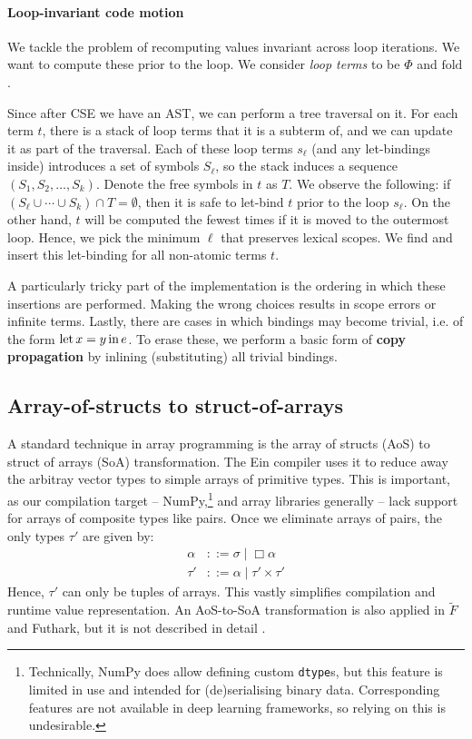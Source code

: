 \paragraph{Loop-invariant code motion} We tackle the problem of recomputing values invariant across loop iterations. We want to compute these prior to the loop. We consider \textit{loop terms} to be $\Phi$ and $\mathrm{fold}$. 

Since after CSE we have an AST, we can perform a tree traversal on it. For each term $t$, there is a stack of loop terms that it is a subterm of, and we can update it as part of the traversal. Each of these loop terms $s_\ell$ (and any let-bindings inside) introduces a set of symbols $S_\ell$, so the stack induces a sequence $(S_1, S_2, \dots, S_k)$. Denote the free symbols in $t$ as $T$. We observe the following: if $\left( S_\ell \cup \cdots \cup S_k \right) \cap T = \emptyset$, then it is safe to let-bind $t$ prior to the loop $s_\ell$. On the other hand, $t$ will be computed the fewest times if it is moved to the outermost loop. Hence, we pick the minimum $\ell$ that preserves lexical scopes. We find and insert this let-binding for all non-atomic terms $t$.

A particularly tricky part of the implementation is the ordering in which these insertions are performed. Making the wrong choices results in scope errors or infinite terms. 
Lastly, there are cases in which bindings may become trivial, i.e. of the form $\mathrm{let}\,{x}={y}\,\mathrm{in}\,{e}$. To erase these, we perform a basic form of \textbf{copy propagation} by inlining (substituting) all trivial bindings.

\subsection{Array-of-structs to struct-of-arrays}

A standard technique in array programming is the array of structs (AoS) to struct of arrays (SoA) transformation. The Ein compiler uses it to reduce away the arbitray vector types to simple arrays of primitive types. This is important, as our compilation target -- NumPy,\footnote{Technically, NumPy does allow defining custom \texttt{dtype}s, but this feature is limited in use and intended for (de)serialising binary data. Corresponding features are not available in deep learning frameworks, so relying on this is undesirable.} and array libraries generally -- lack support for arrays of composite types like pairs. Once we eliminate arrays of pairs, the only types $\tau'$ are given by:
\begin{align*}
\alpha &::= \sigma \mid \Box \alpha \\
\tau' &::= \alpha \mid \tau' \times \tau'
\end{align*}
Hence, $\tau'$ can only be tuples of arrays. This vastly simplifies compilation and runtime value representation. An AoS-to-SoA transformation is also applied in $\tilde F$ and Futhark, but it is not described in detail \cite{henriksen2017futhark, shaikhha2019efficient}. 

